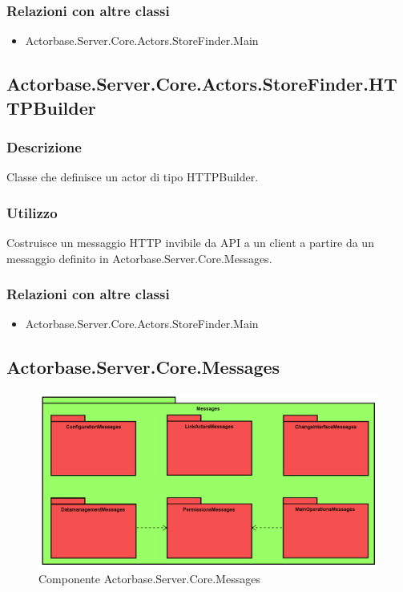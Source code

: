 \documentclass[a4paper]{article}
\begin{document}
			\subsubsection{Relazioni con altre classi}
			\begin{itemize}
				\item Actorbase.Server.Core.Actors.StoreFinder.Main
			\end{itemize}

		\subsection{Actorbase.Server.Core.Actors.StoreFinder.HTTPBuilder}
			\subsubsection{Descrizione}
				Classe che definisce un actor di tipo HTTPBuilder.
			\subsubsection{Utilizzo}
				Costruisce un messaggio HTTP invibile da API a un client a partire da un messaggio definito in Actorbase.Server.Core.Messages.
			\subsubsection{Relazioni con altre classi}
			\begin{itemize}
				\item Actorbase.Server.Core.Actors.StoreFinder.Main
			\end{itemize}
		
		\subsection{Actorbase.Server.Core.Messages}
			\begin{figure} [H]
			\centering
			\includegraphics[scale=0.55]{Server/Package/MessagesLevel.png}
			\caption{Componente Actorbase.Server.Core.Messages}
			\end{figure}
\end{document}
